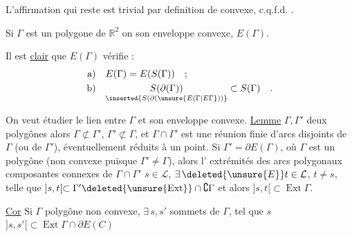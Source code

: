 L'affirmation qui reste est trivial par definition de convexe,  c.q.f.d. .

Si $\Gamma$ est un polygone de $\mathbb{R}^{2}$ on  son enveloppe convexe, $E(\Gamma)$.

Il est \uline{clair} que $E(\Gamma)$ vérifie :
\[
\begin{aligned}
\text{a)}\quad & E(\Gamma)=E(S(\Gamma))\quad;\\
\text{b)}\quad & \underset{\inserted{S(\partial(\unsure{E(\Gamma|E\Gamma}))}}{S(\partial(\Gamma))}\subset S(\Gamma)\quad.
\end{aligned}
\]

On veut étudier le lien entre $\Gamma$ et son enveloppe convexe.
\uline{Lemme}  $\Gamma,\Gamma'$ deux polygônes   alors $\Gamma\not\subset\Gamma'$, $\Gamma'\not\subset\Gamma$, et $\Gamma\cap\Gamma'$ est une réunion finie d'arcs disjoints de $\Gamma$ (ou de $\Gamma'$), éventuellement réduits à un point.
Si $\Gamma'=\partial E(\Gamma)$, où $\Gamma$ est un polygône (non convexe puisque $\Gamma'\ne\Gamma$), alors l'  extrémités des arcs polygonaux composantes connexes de $\Gamma\cap\Gamma'$      $s\in\mathcal{L}$, $\exists\,\deleted{\unsure{E}}t\in\mathcal{L}$, $t\ne s$, telle que $]s,t[\subset\Gamma'\deleted{\unsure{\operatorname{Ext}}}\cap\complement\Gamma$ et alors $]s,t[\subset\operatorname{Ext}\Gamma$.


\uline{Cor} Si $\Gamma$ polygône non convexe, $\exists\,s,s'$ sommets  de $\Gamma$, tel que $s$  $]s,s'[\subset\operatorname{Ext}\Gamma\cap\partial E(C)$

